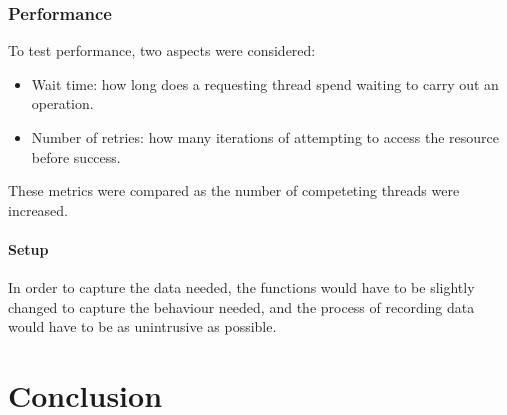 \documentclass[12pt]{article}
\begin{document}
\section{Performance}

To test performance, two aspects were considered:

\begin{itemize}
\item Wait time: how long does a requesting thread spend waiting to carry out an operation.
\item Number of retries: how many iterations of attempting to access the resource before success.
\end{itemize}

\noindent These metrics were compared as the number of competeting threads were increased.

\subsection{Setup}

In order to capture the data needed, the functions would have to be slightly changed to capture the behaviour needed, and the process of recording data would have to be as unintrusive as possible.



\part*{Conclusion}



\end{document}
